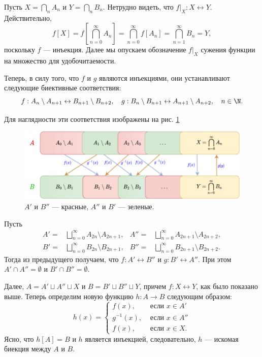 \begin{enumerate}
Пусть $X=\bigcap_n A_n$ и $Y=\bigcap_n B_n$. Нетрудно видеть, что $f|_X:X\leftrightarrow Y$. Действительно, 
$$
f[X] = f\left[\bigcap\limits_{n=0}^\infty A_n\right]=\bigcap\limits_{n=0}^\infty f[A_n]=\bigcap\limits_{n=1}^\infty B_n=Y,
$$
поскольку $f$ --- инъекция. Далее мы опускаем обозначение $f|_X$ сужения функции на множество для удобочитаемости.

Теперь, в силу того, что $f$ и $g$ являются инъекциями, они устанавливают следующие биективные соответствия:
$$
f:A_n\setminus A_{n+1}\leftrightarrow B_{n+1}\setminus B_{n+2},\quad
g:B_n\setminus B_{n+1}\leftrightarrow A_{n+1}\setminus A_{n+2},\quad n\in\N.
$$

Для наглядности эти соответствия изображены на рис. \ref{KBSfig}
\begin{figure}[htb!]
\begin{center}
\includegraphics[scale=0.22]{KBS.png}
\end{center}\caption{$A'$ и $B''$ --- красные, $A''$ и $B'$ --- зеленые.}\label{KBSfig}
\end{figure}


Пусть
\begin{align*}
A'= & \bigsqcup\limits_{n=0}^\infty A_{2n}\setminus A_{2n+1}, &
A''= & \bigsqcup\limits_{n=0}^\infty A_{2n+1}\setminus A_{2n+2},\\
B'= & \bigsqcup\limits_{n=0}^\infty B_{2n}\setminus B_{2n+1}, &
B''= & \bigsqcup\limits_{n=0}^\infty B_{2n+1}\setminus B_{2n+2}.
\end{align*}
Тогда из предыдущего получаем, что $f:A'\leftrightarrow B''$ и $g:B'\leftrightarrow A''$. При этом $A'\cap A''=\emptyset$ и $B'\cap B''=\emptyset$. 

Далее, $A=A'\sqcup A''\sqcup X$ и $B=B'\sqcup B''\sqcup Y$, причем $f:X\leftrightarrow Y$, как было показано выше. Теперь определим новую функцию $h:A\to B$ следующим образом:
$$
h(x) = \begin{cases}
f(x), &\mbox{ если }x\in A' \\
g^{-1}(x), &\mbox{ если }x\in A'' \\
f(x), &\mbox{ если }x\in X.
\end{cases}
$$
Ясно, что $h[A]=B$ и $h$ является инъекцией, следовательно, $h$ --- искомая биекция между $A$ и $B$.
\epf


\end{enumerate}
